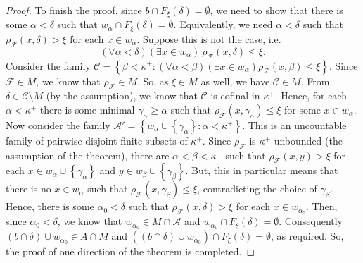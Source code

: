 \documentclass{amsart}
\theoremstyle{plain}
\theoremstyle{definition}
\numberwithin{equation}{section}
\renewcommand{\a}{\alpha}
\renewcommand{\b}{\beta}
\newcommand{\g}{\gamma}
\renewcommand{\d}{\delta}
\renewcommand{\k}{\kappa}
\newcommand{\ps}{\emptyset}
\newcommand{\set}[1]{\left\{#1\right\}}
\begin{document}
\begin{proof}
	To finish the proof, since $b\cap F_{\xi}(\d)=\ps$, we need to show that there is some $\a<\d$ such that $w_{\a}\cap F_{\xi}(\d)=\ps$.
	Equivalently, we need $\a<\d$ such that $\rho_{\mathcal F}(x,\d)>\xi$ for each $x\in w_{\a}$.
	Suppose this is not the case, i.e. $$(\forall \a<\d)(\exists x\in w_{\a})\ \rho_{\mathcal F}(x,\d)\le\xi.$$
	Consider the family $\mathcal C=\set{\b<\k^+:(\forall \a<\b)(\exists x\in w_{\a})\rho_{\mathcal F}(x,\b)\le\xi}$.
	Since $\mathcal F\in M$, we know that $\rho_{\mathcal F}\in M$.
	So, as $\xi\in M$ as well, we have $\mathcal C\in M$.
	From $\d\in \mathcal C\setminus M$ (by the assumption), we know that $\mathcal C$ is cofinal in $\k^+$. %
	Hence, for each $\a<\k^+$ there is some minimal $\g_{\a}\ge\a$ such that $\rho_{\mathcal F}(x,\g_{\a})\le \xi$ for some $x\in w_{\a}$.
	Now consider the family $\mathcal A'=\set{w_{\a}\cup\set{\g_{\a}}:\a<\k^+}$.
	This is an uncountable family of pairwise disjoint finite subsets of $\k^+$.
	Since $\rho_{\mathcal F}$ is $\k^+$-unbounded (the assumption of the theorem), there are $\a<\b<\k^+$ such that $\rho_{\mathcal F}(x,y)>\xi$ for each $x\in w_{\a}\cup\set{\g_{\a}}$ and $y\in w_{\b}\cup\set{\g_{\b}}$.
	But, this in particular means that there is no $x\in w_{\a}$ such that $\rho_{\mathcal F}(x,\g_{\b})\le \xi$, contradicting the choice of $\g_{\b}$.
	Hence, there is some $\a_0<\d$ such that $\rho_{\mathcal F}(x,\d)>\xi$ for each $x\in w_{\a_0}$.
	Then, since $\a_0<\d$, we know that $w_{\a_0}\in M\cap \mathcal A$ and $w_{\a_0}\cap F_{\xi}(\d)=\ps$.
	Consequently $(b\cap\d)\cup w_{\a_0}\in A\cap M$ and $\left((b\cap\d)\cup w_{\a_0}\right)\cap F_{\xi}(\d)=\ps$, as required.
	So, the proof of one direction of the theorem is completed.


\end{proof}
\end{document}
